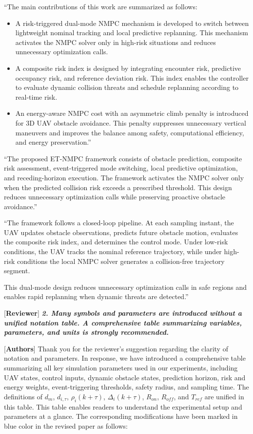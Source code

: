 \documentclass[12pt, twosides]{article}
\theoremstyle{definition}
\begin{document}
``The main contributions of this work are summarized as follows:
\begin{itemize}
	\item A risk-triggered dual-mode NMPC mechanism is developed to switch between lightweight nominal tracking and local predictive replanning. This mechanism activates the NMPC solver only in high-risk situations and reduces unnecessary optimization calls.
	
	\item A composite risk index is designed by integrating encounter risk, predictive occupancy risk, and reference deviation risk. This index enables the controller to evaluate dynamic collision threats and schedule replanning according to real-time risk.
	
	\item An energy-aware NMPC cost with an asymmetric climb penalty is introduced for 3D UAV obstacle avoidance. This penalty suppresses unnecessary vertical maneuvers and improves the balance among safety, computational efficiency, and energy preservation.''  
\end{itemize}

``The proposed ET-NMPC framework consists of obstacle prediction, composite risk assessment, event-triggered mode switching, local predictive optimization, and receding-horizon execution. The framework activates the NMPC solver only when the predicted collision risk exceeds a prescribed threshold. This design reduces unnecessary optimization calls while preserving proactive obstacle avoidance.''  

``The framework follows a closed-loop pipeline. At each sampling instant, the UAV updates obstacle observations, predicts future obstacle motion, evaluates the composite risk index, and determines the control mode. Under low-risk conditions, the UAV tracks the nominal reference trajectory, while under high-risk conditions the local NMPC solver generates a collision-free trajectory segment.

This dual-mode design reduces unnecessary optimization calls in safe regions and enables rapid replanning when dynamic threats are detected.''  

\medskip

\textcolor[rgb]{0.00,0.00,1.00}{[\textbf {Reviewer}]} \textit{\textbf{2. Many symbols and parameters are introduced without a unified notation table. A comprehensive table summarizing variables, parameters, and units is strongly recommended.}}

\textcolor[rgb]{0.00,0.00,1.00}{[\textbf{Authors}]} Thank you for the reviewer's suggestion regarding the clarity of notation and parameters. In response, we have introduced a comprehensive table summarizing all key simulation parameters used in our experiments, including UAV states, control inputs, dynamic obstacle states, prediction horizon, risk and energy weights, event-triggering thresholds, safety radius, and sampling time. The definitions of $d_m$, $d_{i,\tau}$, $\rho_i(k+\tau)$, $\Delta_i(k+\tau)$, $R_{on}$, $R_{off}$, and $T_{ref}$ are unified in this table. This table enables readers to understand the experimental setup and parameters at a glance. The corresponding modifications have been marked in blue color in the revised paper as follows:
\end{document}
